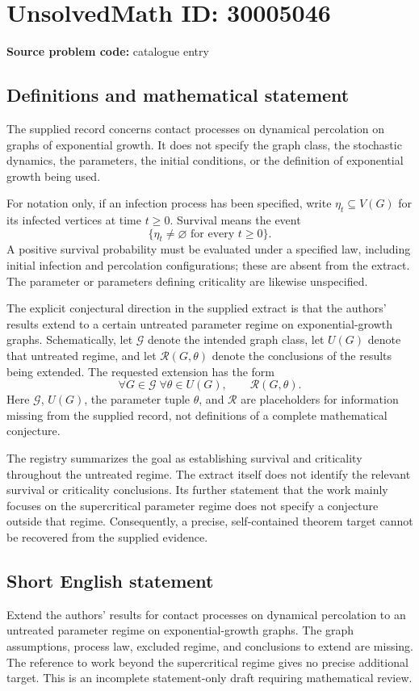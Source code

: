 \documentclass[11pt]{article}
\begin{document}
\section*{UnsolvedMath ID: 30005046}
\textbf{Source problem code:} catalogue entry
\subsection{Definitions and mathematical statement}
The supplied record concerns contact processes on dynamical percolation on graphs of exponential growth. It does not specify the graph class, the stochastic dynamics, the parameters, the initial conditions, or the definition of exponential growth being used.

For notation only, if an infection process has been specified, write \(\eta_t\subseteq V(G)\) for its infected vertices at time \(t\geq 0\). Survival means the event
\[
\{\eta_t\neq\varnothing\text{ for every }t\geq 0\}.
\]
A positive survival probability must be evaluated under a specified law, including initial infection and percolation configurations; these are absent from the extract. The parameter or parameters defining criticality are likewise unspecified.

The explicit conjectural direction in the supplied extract is that the authors' results extend to a certain untreated parameter regime on exponential-growth graphs. Schematically, let \(\mathcal G\) denote the intended graph class, let \(U(G)\) denote that untreated regime, and let \(\mathcal R(G,\theta)\) denote the conclusions of the results being extended. The requested extension has the form
\[
\forall G\in\mathcal G\;\forall\theta\in U(G),\qquad \mathcal R(G,\theta).
\]
Here \(\mathcal G\), \(U(G)\), the parameter tuple \(\theta\), and \(\mathcal R\) are placeholders for information missing from the supplied record, not definitions of a complete mathematical conjecture.

The registry summarizes the goal as establishing survival and criticality throughout the untreated regime. The extract itself does not identify the relevant survival or criticality conclusions. Its further statement that the work mainly focuses on the supercritical parameter regime does not specify a conjecture outside that regime. Consequently, a precise, self-contained theorem target cannot be recovered from the supplied evidence.
\subsection{Short English statement}
Extend the authors' results for contact processes on dynamical percolation to an untreated parameter regime on exponential-growth graphs. The graph assumptions, process law, excluded regime, and conclusions to extend are missing. The reference to work beyond the supercritical regime gives no precise additional target. This is an incomplete statement-only draft requiring mathematical review.
\end{document}

